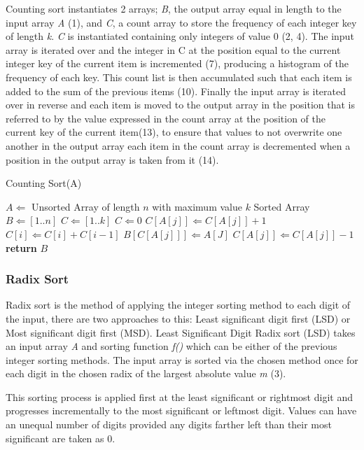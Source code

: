 \documentclass[12pt]{article}
\begin{document}
	\pagebreak
	\label{ssec:counting}
	Counting sort instantiates 2 arrays; \textit{B}, the output array equal in length to the input array \textit{A} (1), and \textit{C}, a count array to store the frequency of each integer key of length \textit{k}. \textit{C} is instantiated containing only integers of value 0 (2, 4). The input array is iterated over and the integer in C at the position equal to the current integer key of the current item is incremented (7), producing a histogram of the frequency of each key. This count list is then accumulated such that each item is added to the sum of the previous items (10). Finally the input array is iterated over in reverse and each item is moved to the output array in the position that is referred to by the value expressed in the count array at the position of the current key of the current item(13), to ensure that values to not overwrite one another in the output array each item in the count array is decremented when a position in the output array is taken from it (14).
	\begin{algorithm}[H]
		\caption{Counting Sort({A})}
		\label{alg2}
		\begin{algorithmic}[1]					
			\REQUIRE $A \Leftarrow$ Unsorted Array of length $n$ with maximum value $k$
			\ENSURE Sorted Array
			\STATE $B \Leftarrow [1..n]$ 
			\STATE $C \Leftarrow [1..k]$ 
				\STATE $C \Leftarrow 0$
			\ENDFOR
				\STATE $C[A[j]] \Leftarrow C[A[j]] + 1$ 
			\ENDFOR
				\STATE $C[i] \Leftarrow C[i] + C[i-1]$
			\ENDFOR
				\STATE $B[C[A[j]]] \Leftarrow A[J]$ 
				\STATE $C[A[j]] \Leftarrow C[A[j]] - 1$ 
			\ENDFOR
			\STATE \textbf{return} $B$
		\end{algorithmic}
	\end{algorithm}	
	\pagebreak
	\subsubsection{Radix Sort}
	Radix sort is the method of applying the integer sorting method to each digit of the input, there are two approaches to this: Least significant digit first (LSD) or Most significant digit first (MSD).
	\label{ssec:lsd}
	Least Significant Digit Radix sort (LSD) takes an input array \textit{A} and sorting function \textit{f()} which can be either of the previous integer sorting methods. The input array is sorted via the chosen method once for each digit in the chosen radix of the largest absolute value \textit{m} (3).
	\par 
	This sorting process is applied first at the least significant or rightmost digit and progresses incrementally to the most significant or leftmost digit. Values can have an unequal number of digits provided any digits farther left than their most significant are taken as 0.
	
\end{document}
